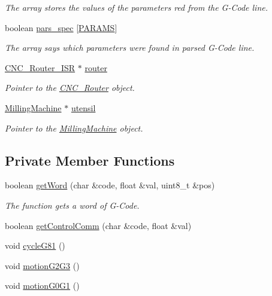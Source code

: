 \begin{DoxyCompactItemize}
\begin{DoxyCompactList}\small\item\em The array stores the values of the parameters red from the G-\/\+Code line. \end{DoxyCompactList}\item 
boolean \hyperlink{class_g_code_a6d11b02685ef1b387a3c9da004547006}{pars\+\_\+spec} \mbox{[}\hyperlink{_g_code__def_8h_ab0b1e59d96396ba9dca2147f9feb44eb}{P\+A\+R\+A\+M\+S}\mbox{]}
\begin{DoxyCompactList}\small\item\em The array says which parameters were found in parsed G-\/\+Code line. \end{DoxyCompactList}\item 
\hyperlink{class_c_n_c___router___i_s_r}{C\+N\+C\+\_\+\+Router\+\_\+\+I\+S\+R} $\ast$ \hyperlink{class_g_code_a8edb8e20bfa27ed777bedf9287043407}{router}
\begin{DoxyCompactList}\small\item\em Pointer to the \hyperlink{class_c_n_c___router}{C\+N\+C\+\_\+\+Router} object. \end{DoxyCompactList}\item 
\hyperlink{class_milling_machine}{Milling\+Machine} $\ast$ \hyperlink{class_g_code_a9a737c33f133cf515926d0f2b612bd22}{utensil}
\begin{DoxyCompactList}\small\item\em Pointer to the \hyperlink{class_milling_machine}{Milling\+Machine} object. \end{DoxyCompactList}\end{DoxyCompactItemize}
\subsection*{Private Member Functions}
\begin{DoxyCompactItemize}
\item 
boolean \hyperlink{class_g_code_a3917539a094b14d9928bb00ed74eabfe}{get\+Word} (char \&code, float \&val, uint8\+\_\+t \&pos)
\begin{DoxyCompactList}\small\item\em The function gets a word of G-\/\+Code. \end{DoxyCompactList}\item 
boolean \hyperlink{class_g_code_a7b19fe1d76f1c08139011399ca889c1e}{get\+Control\+Comm} (char \&code, float \&val)
\item 
void \hyperlink{class_g_code_ad754ef6693a2b3422c6adaafbc8a2f79}{cycle\+G81} ()
\item 
void \hyperlink{class_g_code_a44eabd18f470e248fed7a53df495d05f}{motion\+G2\+G3} ()
\item 
void \hyperlink{class_g_code_a74e9e50305d574e214eb8b5a7c55a9f6}{motion\+G0\+G1} ()
\end{DoxyCompactItemize}


